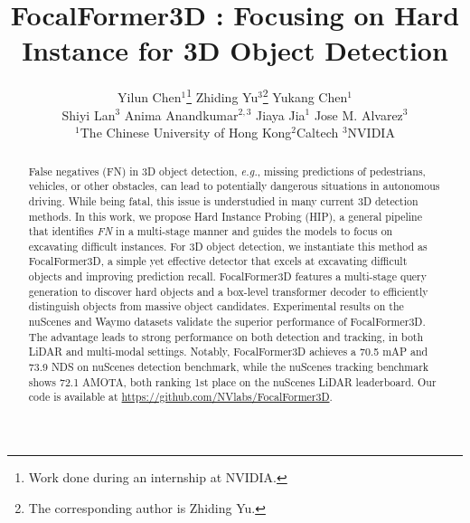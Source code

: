 \documentclass[10pt,twocolumn,letterpaper]{article}
\begin{document}
\title{FocalFormer3D : Focusing on Hard Instance for 3D Object Detection}


\author{Yilun Chen$^1$\thanks{Work done during an internship at NVIDIA.} \quad Zhiding Yu$^3$\thanks{The corresponding author is Zhiding Yu.} \quad Yukang Chen$^1$ \quad \\ Shiyi Lan$^3$ \quad
Anima Anandkumar$^{2,3}$ \quad Jiaya Jia$^1$ \quad Jose M. Alvarez$^3$ \\
$^1$The Chinese University of Hong Kong\quad $^2$Caltech \quad $^3$NVIDIA 
}

\maketitle
\ificcvfinal\thispagestyle{empty}\fi

\begin{abstract}
False negatives (FN) in 3D object detection, {\em e.g.}, missing predictions of pedestrians, vehicles, or other obstacles, can lead to potentially dangerous situations in autonomous driving. While being fatal, this issue is understudied in many current 3D detection methods. In this work, we propose Hard Instance Probing (HIP), a general pipeline that identifies \textit{FN} in a multi-stage manner and guides the models to focus on excavating difficult instances. For 3D object detection, we instantiate this method as FocalFormer3D, a simple yet effective detector that excels at excavating difficult objects and improving prediction recall. FocalFormer3D features a multi-stage query generation to discover hard objects and a box-level transformer decoder to efficiently distinguish objects from massive object candidates. Experimental results on the nuScenes and Waymo datasets validate the superior performance of FocalFormer3D. The advantage leads to strong performance on both detection and tracking, in both LiDAR and multi-modal settings. Notably, FocalFormer3D achieves a 70.5 mAP and 73.9 NDS on nuScenes detection benchmark, while the nuScenes tracking benchmark shows 72.1 AMOTA, both ranking 1st place on the nuScenes LiDAR leaderboard.
Our code is available at \url{https://github.com/NVlabs/FocalFormer3D}.

\end{abstract}
\end{document}
